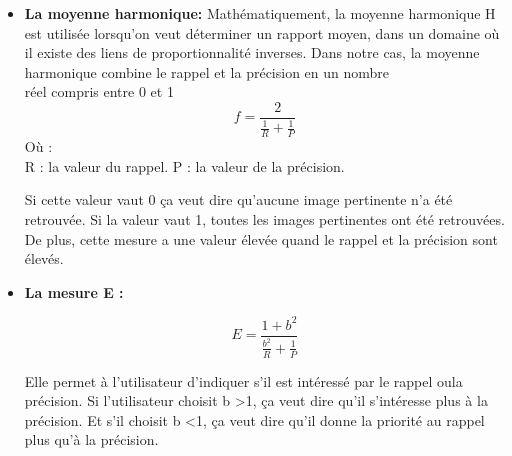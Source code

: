 \begin{itemize}
	\item \textbf{La moyenne harmonique:} Mathématiquement, la moyenne 
	harmonique H est utilisée lorsqu'on
	veut déterminer un rapport moyen,
	dans un domaine où il existe des 
	liens de proportionnalité inverses.
	Dans notre cas, la moyenne harmonique
	combine le rappel et la précision en un
	nombre\\ réel compris entre 0 et 1 
	\begin{equation}
	    f = \frac{2}{\frac{1}{R}+\frac{1}{P}}
	\end{equation}
	Où :\\
	R : la valeur du rappel.  \space\space	P : la valeur de la précision.
	
	
	Si cette valeur vaut 0 ça veut dire
	qu’aucune image pertinente n’a été
	retrouvée. Si la valeur vaut 1, toutes
	les images pertinentes ont été
	retrouvées. De plus, cette mesure a 
	une valeur élevée quand le rappel et la
	précision sont élevés.
	
	\item\textbf{ La mesure E :}

\begin{equation}
		 E = \frac{1+b^2}{\frac{b^2}{R}+\frac{1}{P}}
\end{equation}
	
	Elle permet à l’utilisateur d’indiquer 
	s’il est intéressé par le rappel oula précision.
	Si l’utilisateur choisit b >1, ça veut dire qu’il s’intéresse plus à la précision.
	Et s’il choisit b <1, ça veut dire qu’il donne la priorité au rappel plus qu’à la précision.    
\end{itemize}
		
